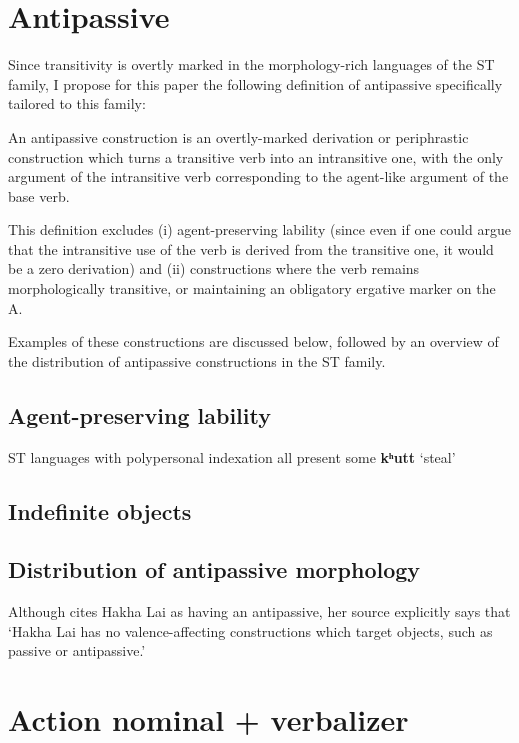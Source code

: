 \documentclass[oneside,a4paper,11pt]{article}
\newcommand{\ipa}[1]{{\phon\textbf{#1}}}
\begin{document}
\section{Antipassive}
Since transitivity is overtly marked in the morphology-rich languages of the ST family, I propose for this paper the following definition of antipassive specifically tailored to this family:

\begin{exe}
\ex 
\glt An antipassive construction is an overtly-marked derivation or periphrastic construction which turns a transitive verb into an intransitive one, with the only argument of the intransitive verb corresponding to the agent-like argument of the base verb.
\end{exe}

This definition excludes  (i) agent-preserving lability (since even if one could argue that the intransitive use of the verb is derived from the transitive one, it would be a zero derivation) and (ii) constructions where the verb remains morphologically transitive, or maintaining an obligatory ergative marker on the A. 

Examples of these constructions are discussed below, followed by an overview of the distribution of antipassive constructions in the ST family.

\subsection{Agent-preserving lability}

ST languages with polypersonal indexation all present some 
\citet{bickel07puma}
\citet[527]{driem91tangut}
\ipa{kʰutt} `steal'
\citet{jacques12demotion}

\subsection{Indefinite objects}
\citet[335]{doornenbal09}

\subsection{Distribution of antipassive morphology}
Although \citet{polinsky11antipassive} cites Hakha Lai as having an antipassive, her source \citet[37]{peterson07appl} explicitly says that `Hakha Lai has no valence-affecting constructions which target objects, such as passive or antipassive.'

\section{Action nominal + verbalizer}
\citet{creissels12antip}
\citet{jacques14antipassive}
\end{document}

